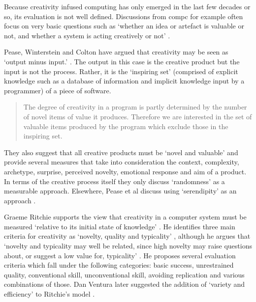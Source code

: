 Because creativity infused computing has only emerged in the last few decades or so, its evaluation is not well defined. Discussions from \gls{compc} for example often focus on very basic questions such as `whether an idea or artefact is valuable or not, and whether a system is acting creatively or not' \autocite{Pease2011}.

Pease, Winterstein and Colton have argued that creativity may be seen as `output minus input.' \autocite[p.2]{Pease2001}. The output in this case is the creative product but the input is not the process. Rather, it is the `inspiring set' (comprised of explicit knowledge such as a database of information and implicit knowledge input by a programmer) of a piece of software.

\begin{quotation}
  The degree of creativity in a program is partly determined by the number of novel items of value it produces. Therefore we are interested in the set of valuable items produced by the program which exclude those in the inspiring set. 
\end{quotation}

They also suggest that all creative products must be `novel and valuable' \citeyear[p.1]{Pease2001} and provide several measures that take into consideration the context, complexity, archetype, surprise, perceived novelty, emotional response and aim of a product. In terms of the creative process itself they only discuss `randomness' as a measurable approach. Elsewhere, Pease et al discuss using `serendipity' as an approach \citeyear{Pease2013}.

Graeme Ritchie supports the view that creativity in a computer system must be measured `relative to its initial state of knowledge' \autocite[p.72]{Ritchie2007}. He identifies three main criteria for creativity as `novelty, quality and typicality' \citeyear[p.72-73]{Ritchie2007}, although he argues that `novelty and typicality may well be related, since high novelty may raise questions about, or suggest a low value for, typicality' \citeyear[p.73]{Ritchie2007} \citeyear[see also][]{Ritchie2001}. He proposes several evaluation criteria which fall under the following categories: \autocite[p.91-92]{Ritchie2007} basic success, unrestrained quality, conventional skill, unconventional skill, avoiding replication and various combinations of those. Dan Ventura later suggested the addition of `variety and efficiency' to Ritchie's model \citeyear[p.7]{Ventura2008}.

